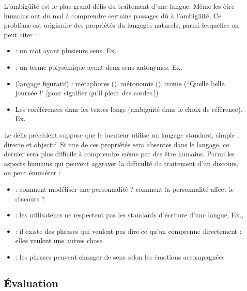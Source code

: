 \documentclass{KodeBook}
\begin{document}
L'ambigüité est le plus grand défis du traitement d'une langue. 
Même les être humains ont du mal à comprendre certains passages dû à l'ambigüité.
Ce problème est originaire des propriétés du langages naturels, parmi lesquelles on peut citer :
\begin{itemize}
	\item {} : un mot ayant plusieurs sens. Ex. 
	\item {} : un terme polysémique ayant deux sens antonymes. Ex. 
	\item {} (langage figuratif) : métaphores (), métonomie (), ironie (``Quelle belle journée !" [pour signifier qu'il pleut des cordes.])
	\item Les coréférences dans les textes longs (ambigüité dans le choix de référence). 
	Ex. 
\end{itemize}

Le défis précédent suppose que le locuteur utilise un langage standard, simple , directe et objectif.
Si une de ces propriétés sera absentes dans le langage, ce dernier sera plus difficile à comprendre même par des être humains.
Parmi les aspects humains qui peuvent aggraver la difficulté du traitement d'un discours, on peut énumérer :
\begin{itemize}
	\item {} : comment modéliser une personnalité ? comment la personnalité affect le discours ?
	\item {} : les utilisateurs ne respectent pas les standards d'écriture d'une langue. Ex., 
	\item {} : il existe des phrases qui veulent pas dire ce qu'on comprenne directement ; elles veulent une autres chose
	\item {} : les phrases peuvent changer de sens selon les émotions accompagnées
\end{itemize}

\subsection{Évaluation}
\end{document}
